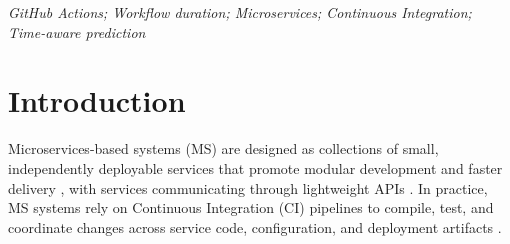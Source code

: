 \documentclass[conference]{IEEEconf}
\newcommand{\ali}[1]{\textcolor{red}{{\it [Ali: #1]}}}
\newcommand{\jasem}[1]{\textcolor{blue}{{\it [Jasem: #1]}}}
\begin{document}
\begin{abstract}
\end{abstract}

\IEEEoverridecommandlockouts
\vspace{1.5ex}
\begin{keywords}
\itshape GitHub Actions; Workflow duration; Microservices; Continuous Integration; Time-aware prediction
\end{keywords}

\IEEEpeerreviewmaketitle

\section{Introduction}
Microservices-based systems (MS) are designed as collections of small, independently deployable services that promote modular development and faster delivery \cite{taibi2019continuous}, with services communicating through lightweight APIs \cite{karabey2021deployment}. In practice, MS systems rely on Continuous Integration (CI) pipelines to compile, test, and coordinate changes across service code, configuration, and deployment artifacts \cite{baresi2022docker}.
\end{document}
